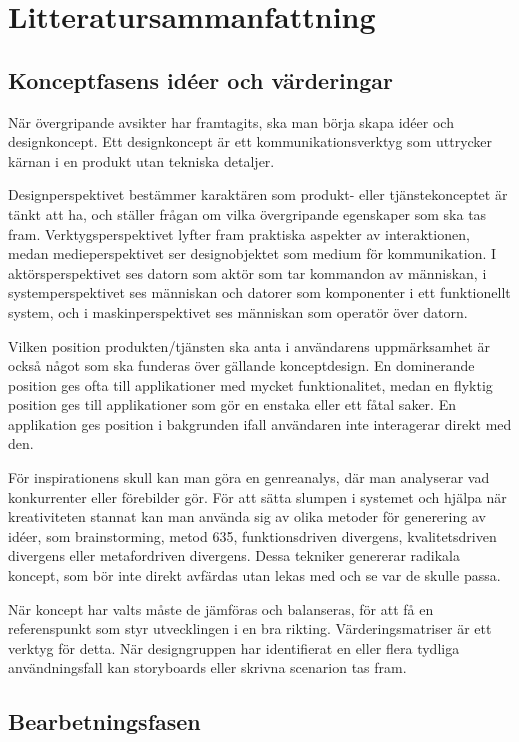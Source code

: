 \documentclass[a4paper,12pt,titlepage]{article}
\begin{document}
\section*{Litteratursammanfattning}
\subsection*{Konceptfasens idéer och värderingar}

När övergripande avsikter har framtagits, ska man börja skapa idéer och
designkoncept. Ett designkoncept är ett kommunikationsverktyg som uttrycker kärnan i en
produkt utan tekniska detaljer. 

Designperspektivet bestämmer karaktären som produkt- eller tjänstekonceptet är tänkt
att ha, och ställer frågan om vilka övergripande egenskaper som ska tas fram.
Verktygsperspektivet lyfter fram praktiska aspekter av interaktionen,
medan medieperspektivet ser designobjektet som medium för kommunikation.
I aktörsperspektivet ses datorn som aktör som tar kommandon av människan, i
systemperspektivet ses människan och datorer som komponenter i ett funktionellt
system, och i maskinperspektivet ses människan som operatör över datorn.

Vilken position produkten/tjänsten ska anta i användarens uppmärksamhet 
är också något som ska funderas över gällande konceptdesign.
En dominerande position ges ofta till applikationer med mycket funktionalitet,
medan en flyktig position ges till applikationer som gör en enstaka eller ett
fåtal saker. En applikation ges position i bakgrunden ifall användaren inte
interagerar direkt med den.

För inspirationens skull kan man göra en genreanalys, där man analyserar vad
konkurrenter eller förebilder gör. För att sätta slumpen i systemet och hjälpa
när kreativiteten stannat kan man
använda sig av olika metoder för generering av idéer, som brainstorming, metod
635, funktionsdriven divergens, kvalitetsdriven divergens eller metafordriven
divergens. Dessa tekniker genererar radikala koncept, som bör inte direkt
avfärdas utan lekas med och se var de skulle passa.

När koncept har valts måste de jämföras och balanseras, för att få en referenspunkt som
styr utvecklingen i en bra rikting. Värderingsmatriser är ett verktyg för detta.
När designgruppen har identifierat en eller flera tydliga användningsfall kan storyboards
eller skrivna scenarion tas fram.

\subsection*{Bearbetningsfasen}
\end{document}
